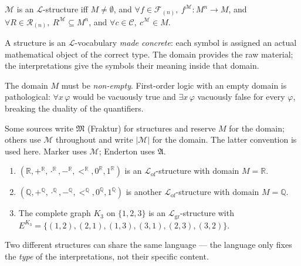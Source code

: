 \begin{remark*}
$\mathcal{M}$ is an $\mathcal{L}$-structure iff
$M \neq \emptyset$,
and $\forall f \in \mathcal{F}_{(n)},\ f^{\mathcal{M}} : M^n \to M$,
and $\forall R \in \mathcal{R}_{(n)},\ R^{\mathcal{M}} \subseteq M^n$,
and $\forall c \in \mathcal{C},\ c^{\mathcal{M}} \in M$.
\end{remark*}

\begin{remark*}[Intuition]
A structure is an $\mathcal{L}$-vocabulary \emph{made concrete}: each
symbol is assigned an actual mathematical object of the correct type.
The domain provides the raw material; the interpretations give the
symbols their meaning inside that domain.
\end{remark*}

\begin{remark*}
The domain $M$ must be \emph{non-empty}. First-order logic with an empty
domain is pathological: $\forall x\, \varphi$ would be vacuously true
and $\exists x\, \varphi$ vacuously false for every $\varphi$, breaking
the duality of the quantifiers.
\end{remark*}

\begin{remark*}
Some sources write $\mathfrak{M}$ (Fraktur) for structures and reserve
$M$ for the domain; others use $\mathcal{M}$ throughout and write
$|\mathcal{M}|$ for the domain. The latter convention is used here.
Marker uses $\mathcal{M}$; Enderton uses $\mathfrak{A}$.
\end{remark*}


\begin{example*}
\begin{enumerate}
  \item $(\mathbb{R}, +^{\mathbb{R}}, \cdot^{\mathbb{R}}, -^{\mathbb{R}},
         <^{\mathbb{R}}, 0^{\mathbb{R}}, 1^{\mathbb{R}})$
        is an $\mathcal{L}_{\mathrm{of}}$-structure with domain
        $M = \mathbb{R}$.

  \item $(\mathbb{Q}, +^{\mathbb{Q}}, \cdot^{\mathbb{Q}}, -^{\mathbb{Q}},
         <^{\mathbb{Q}}, 0^{\mathbb{Q}}, 1^{\mathbb{Q}})$
        is another $\mathcal{L}_{\mathrm{of}}$-structure with domain
        $M = \mathbb{Q}$.

  \item The complete graph $K_3$ on $\{1,2,3\}$ is an
        $\mathcal{L}_{\mathrm{gr}}$-structure with
        $E^{K_3} = \{(1,2),(2,1),(1,3),(3,1),(2,3),(3,2)\}$.
\end{enumerate}
Two different structures can share the same language --- the language only
fixes the \emph{type} of the interpretations, not their specific content.
\end{example*}

